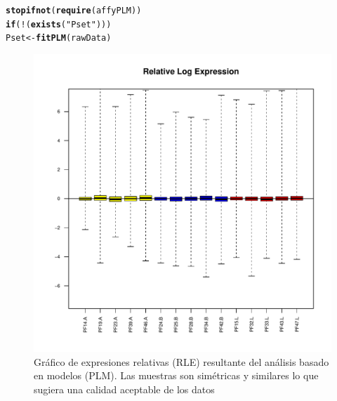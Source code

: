 \documentclass[a4paper]{article}\usepackage[]{graphicx}\usepackage[]{color}
\makeatletter
\def\maxwidth{ %
  \ifdim\Gin@nat@width>\linewidth
    \linewidth
  \else
    \Gin@nat@width
  \fi
}
\newcommand{\hlstr}[1]{\textcolor[rgb]{0.192,0.494,0.8}{#1}}%
\newcommand{\hlopt}[1]{\textcolor[rgb]{0,0,0}{#1}}%
\newcommand{\hlstd}[1]{\textcolor[rgb]{0.345,0.345,0.345}{#1}}%
\newcommand{\hlkwa}[1]{\textcolor[rgb]{0.161,0.373,0.58}{\textbf{#1}}}%
\newcommand{\hlkwb}[1]{\textcolor[rgb]{0.69,0.353,0.396}{#1}}%
\newcommand{\hlkwd}[1]{\textcolor[rgb]{0.737,0.353,0.396}{\textbf{#1}}}%
\newenvironment{kframe}{%
 \def\at@end@of@kframe{}%
 \ifinner\ifhmode%
  \def\at@end@of@kframe{\end{minipage}}%
  \begin{minipage}{\columnwidth}%
 \fi\fi%
 \def\FrameCommand##1{\hskip\@totalleftmargin \hskip-\fboxsep
 \colorbox{shadecolor}{##1}\hskip-\fboxsep
     \hskip-\linewidth \hskip-\@totalleftmargin \hskip\columnwidth}%
 \MakeFramed {\advance\hsize-\width
   \@totalleftmargin\z@ \linewidth\hsize
   \@setminipage}}%
 {\par\unskip\endMakeFramed%
 \at@end@of@kframe}
\newenvironment{knitrout}{}{} %
\makeatother
\begin{document}
\begin{knitrout}
\color{fgcolor}\begin{kframe}
\begin{alltt}
\hlkwd{stopifnot}\hlstd{(}\hlkwd{require}\hlstd{(affyPLM))}
\hlkwa{if} \hlstd{(}\hlopt{!}\hlstd{(}\hlkwd{exists}\hlstd{(}\hlstr{"Pset"}\hlstd{)))}
  \hlstd{Pset}\hlkwb{<-} \hlkwd{fitPLM}\hlstd{(rawData)}
\end{alltt}
\end{kframe}
\end{knitrout}


\begin{figure}[htbp]
 \centering
\begin{knitrout}
\color{fgcolor}
\includegraphics[width=\maxwidth]{images/graficplotRLE-1} 

\end{knitrout}
\caption{Gráfico de expresiones relativas (RLE) resultante del análisis basado en modelos (PLM). Las muestras son simétricas y similares lo que sugiera una calidad aceptable de los datos}
\label{fig:RLE}
\end{figure}
\end{document}
